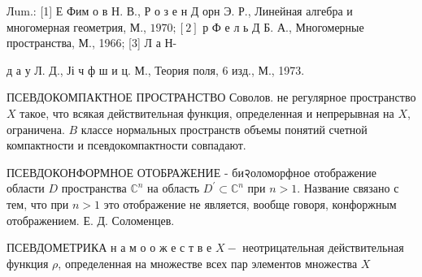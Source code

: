 \documentclass[10pt]{article}
\begin{document}
Лum.: [1] Е Фим о в Н. В., Р о з е н Д орн Э. Р., Линейная алгебра и многомерная геометрия, М., $1970 ;[2]$ р Ф е л ь Д Б. А., Многомерные пространства, М., 1966; [3] Л а Н-

д а у Л. Д., Јі ч ф ш и ц. М., Теория поля, 6 изд., М., 1973.



ПСЕВДОКОМПАКТНОЕ ПРОСТРАНСТВО Соволов. не регулярное пространство $X$ такое, что всякая действительная функция, определенная и непрерывная на $X$, ограничена. $B$ классе нормальных пространств объемы понятий счетной компактности и псевдокомпактности совпадают.



ПСЕВДОКОНФОРМНОЕ ОТОБРАЖЕНИЕ - би२оломорфное отображение области $D$ пространства $\mathbb{C}^{n}$ на область $D^{\prime} \subset \mathbb{C}^{n}$ при $n>1$. Название связано с тем, что при $n>1$ это отображение не является, вообще говоря, конфоржным отображением. Е. Д. Соломенцев.



ПСЕВДОМЕТРИКА н а м о о ж е с т в е $X-$ неотрицательная действительная функция $\rho$, определенная на множестве всех пар элементов множества $X$
\end{document}
